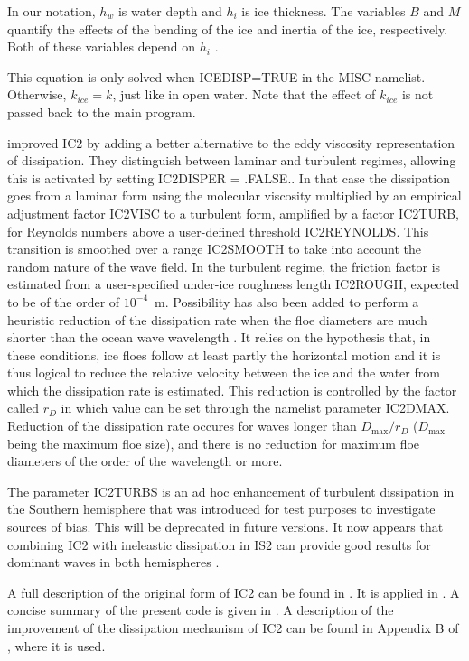 \noindent
In our notation, $h_w$ is water depth and $h_i$ is ice thickness.  The
variables $B$ and $M$ quantify the effects of the bending of the ice and
inertia of the ice, respectively. Both of these variables depend on $h_i$ 
\citep[see][]{art:LMC88, art:LHV91}.

This equation is only solved when ICEDISP=TRUE in the {\F MISC} namelist. Otherwise, $k_{ice}=k$, just like in open water. 
Note that the effect of $k_{ice}$ is not passed back to the main program. 

 \cite{art:SAG16} improved {\code IC2} by adding a better alternative to the eddy viscosity representation of dissipation. 
They distinguish between laminar and 
turbulent regimes, allowing this is activated by setting  {\code IC2DISPER = .FALSE.}. 
In that case the dissipation goes from a laminar form using the molecular viscosity multiplied by an 
empirical adjustment factor {\code IC2VISC} to a turbulent form, amplified by a factor {\code IC2TURB}, for Reynolds numbers 
above a user-defined threshold {\code IC2REYNOLDS}. This transition is smoothed over a range {\code IC2SMOOTH} to take into 
account the random nature of the wave field. In the turbulent regime, the friction factor 
is estimated from a user-specified under-ice roughness length {\code IC2ROUGH}, expected to be of the order of $10^{-4}$~m. 
Possibility has also been added to perform a heuristic reduction of the dissipation 
rate when the floe diameters are much shorter than the ocean wave 
wavelength \citep[see][for details]{Aea18}. It relies on the hypothesis that, in these conditions, ice floes follow at least partly 
the horizontal motion and it is thus logical to reduce the relative velocity 
between the ice and the water from which the dissipation rate is estimated. 
This reduction is controlled by the factor called $r_D$ in \cite{Aea18} which value can be set through the namelist parameter {\code IC2DMAX}. 
Reduction of the dissipation rate occures for waves longer than $D_{\max}/r_D$ ($D_{\max}$ 
being the maximum floe size), and there is no reduction for maximum floe diameters of the order of 
the wavelength or more.

The parameter {\code IC2TURBS} is an ad hoc enhancement of turbulent dissipation in the Southern hemisphere 
that was introduced for test purposes to investigate sources of bias. This will be deprecated in future versions. It now appears 
that combining IC2 with ineleastic dissipation in IS2 can provide good results for dominant waves in both hemispheres \citep{Aea18}. 

A full description of the original form of {\code IC2} can be found in \cite{rep:RO13}. 
It is applied in \cite{art:LKS15}. A concise summary of the present code is given 
in \cite{rep:RPLA18}. A description of the improvement of the dissipation mechanism 
of {\code IC2} can be found in Appendix B of \cite{art:SAG16}, where it is used.
